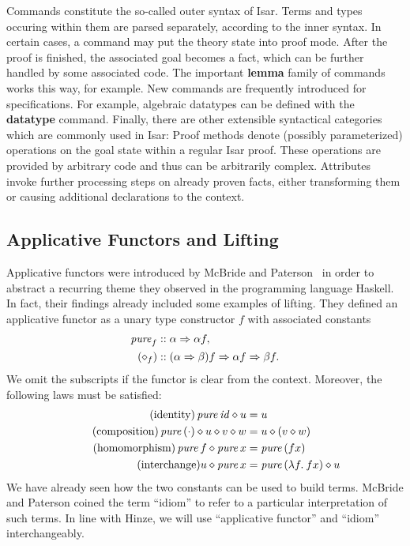 Commands constitute the so-called outer syntax of Isar.
Terms and types occuring within them are parsed separately, according to the
inner syntax.
In certain cases, a command may put the theory state into proof mode.
After the proof is finished, the associated goal becomes a fact, which can be
further handled by some associated code.
The important \textbf{lemma} family of commands works this way, for example.
New commands are frequently introduced for specifications.
For example, algebraic datatypes can be defined with the \textbf{datatype} command.
Finally, there are other extensible syntactical categories which are commonly
used in Isar:
Proof methods denote (possibly parameterized) operations on the goal state
within a regular Isar proof.
These operations are provided by arbitrary code and thus can be arbitrarily
complex.
Attributes invoke further processing steps on already proven facts, either
transforming them or causing additional declarations to the context.


\subsection{Applicative Functors and Lifting}\label{subsec:applicative}

Applicative functors were introduced by McBride and Paterson~\cite{mcbride08}
in order to abstract a recurring theme they observed in the programming language
Haskell.
In fact, their findings already included some examples of lifting.
They defined an applicative functor as a unary type constructor $f$ with
associated constants
\begin{align*}
	\operatorname{\mathit{pure}}_f &\mathrel{::} \alpha \Rightarrow \alpha f, \\
	(\diamond_f) &\mathrel{::} (\alpha \Rightarrow \beta) f \Rightarrow \alpha f \Rightarrow \beta f.
\end{align*}
We omit the subscripts if the functor is clear from the context.
Moreover, the following laws must be satisfied:
\begin{align*}
	\tag{identity} \operatorname{\mathit{pure}}{\mathit{id}} \diamond u &= u \\
	\tag{composition} \operatorname{\mathit{pure}}{(\cdot)} \diamond u \diamond v \diamond w &= u \diamond (v \diamond w) \\
	\tag{homomorphism} \operatorname{\mathit{pure}}{f} \diamond \operatorname{\mathit{pure}} x &= \operatorname{\mathit{pure}}{(f x)} \\
	\tag{interchange} u \diamond \operatorname{\mathit{pure}}{x} &= \operatorname{\mathit{pure}}{(\lambda f.\>f x)} \diamond u
\end{align*}
We have already seen how the two constants can be used to build terms.
McBride and Paterson coined the term ``idiom'' to refer to a particular
interpretation of such terms.
In line with Hinze, we will use ``applicative functor'' and ``idiom''
interchangeably.

